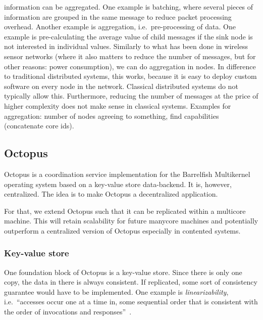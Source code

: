 \documentclass{article}
\begin{document}
\begin{itemize}
  information can be aggregated. One example is batching, where several
  pieces of information are grouped in the same message to reduce packet
  processing overhead. Another example is aggregation, i.e.\
  pre-processing of data. One example is pre-calculating the average
  value of child messages if the sink node is not interested in
  individual values. %
  Similarly to what has been done in wireless sensor networks (where it
  also matters to reduce the number of messages, but for other reasons:
  power consumption), we can do aggregation in nodes. In difference to
  traditional distributed systems, this works, because it is easy to
  deploy custom software on every node in the network. Classical
  distributed systems do not typically allow this. Furthermore, reducing
  the number of messages at the price of higher complexity does not make
  sense in classical systems. %
  Examples for aggregation: number of nodes agreeing to something, find
  capabilities (concatenate core ids). 
\end{itemize}

\subsection{Octopus}

Octopus is a coordination service implementation for the Barrelfish
Multikernel operating system based on a key-value store
data-backend. It is, however, centralized. The idea is to make Octopus
a decentralized application.

For that, we extend Octopus such that it can be replicated within a
multicore machine. This will retain scalability for future manycore
machines and potentially outperform a centralized version of Octopus
especially in contented systems.

\subsubsection{Key-value store}

One foundation block of Octopus is a key-value store. Since there is
only one copy, the data in there is always consistent. If replicated,
some sort of consistency guarantee would have to be implemented. One
example is \emph{linearizability}, i.e.\ ``accesses occur one at a time
in, some sequential order that is consistent with the order of
invocations and responses''~\cite{lynch}.
\end{document}
